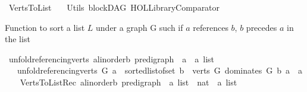 %
\begin{isabellebody}%
%
%
\isadelimtheory
%
\endisadelimtheory
%
\isatagtheory
{}\isamarkupfalse%
\ Verts{\isacharunderscore}{\kern0pt}To{\isacharunderscore}{\kern0pt}List\isanewline
\ \ \ Utils\ blockDAG\ {\isachardoublequoteopen}HOL{\isacharminus}{\kern0pt}Library{\isachardot}{\kern0pt}Comparator{\isachardoublequoteclose}\isanewline
{}%
\endisatagtheory
{\isafoldtheory}%
%
\isadelimtheory
%
\endisadelimtheory
%
\begin{isamarkuptext}%
Function to sort a list $L$ under a graph G such if $a$ references $b$,
$b$ precedes $a$ in the list%
\end{isamarkuptext}\isamarkuptrue%
\isamarkupfalse%
\ unfold{\isacharunderscore}{\kern0pt}referencing{\isacharunderscore}{\kern0pt}verts{\isacharcolon}{\kern0pt}{\isacharcolon}{\kern0pt}\ {\isachardoublequoteopen}{\isacharparenleft}{\kern0pt}{\isacharprime}{\kern0pt}a{\isacharcolon}{\kern0pt}{\isacharcolon}{\kern0pt}linorder{\isacharcomma}{\kern0pt}{\isacharprime}{\kern0pt}b{\isacharparenright}{\kern0pt}\ pre{\isacharunderscore}{\kern0pt}digraph\ {\isasymRightarrow}\ {\isacharprime}{\kern0pt}a\ {\isasymRightarrow}\ {\isacharprime}{\kern0pt}a\ list{\isachardoublequoteclose}\ \isanewline
\ \ \ {\isachardoublequoteopen}unfold{\isacharunderscore}{\kern0pt}referencing{\isacharunderscore}{\kern0pt}verts\ G\ a\ {\isacharequal}{\kern0pt}\ sorted{\isacharunderscore}{\kern0pt}list{\isacharunderscore}{\kern0pt}of{\isacharunderscore}{\kern0pt}set\ {\isacharparenleft}{\kern0pt}{\isacharbraceleft}{\kern0pt}b\ {\isasymin}\ verts\ G{\isachardot}{\kern0pt}\ dominates\ G\ b\ a{\isacharbraceright}{\kern0pt}\ {\isasymunion}\ {\isacharbraceleft}{\kern0pt}a{\isacharbraceright}{\kern0pt}{\isacharparenright}{\kern0pt}{\isachardoublequoteclose}\ \ \isanewline
\isanewline
{}\isamarkupfalse%
\ Verts{\isacharunderscore}{\kern0pt}To{\isacharunderscore}{\kern0pt}List{\isacharunderscore}{\kern0pt}Rec{\isacharcolon}{\kern0pt}{\isacharcolon}{\kern0pt}\ {\isachardoublequoteopen}{\isacharparenleft}{\kern0pt}{\isacharprime}{\kern0pt}a{\isacharcolon}{\kern0pt}{\isacharcolon}{\kern0pt}linorder{\isacharcomma}{\kern0pt}{\isacharprime}{\kern0pt}b{\isacharparenright}{\kern0pt}\ pre{\isacharunderscore}{\kern0pt}digraph\ {\isasymRightarrow}\ {\isacharprime}{\kern0pt}a\ list\ {\isasymRightarrow}\ nat\ {\isasymRightarrow}\ {\isacharprime}{\kern0pt}a\ list{\isachardoublequoteclose}\isanewline

\end{isabellebody}
